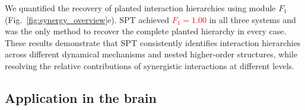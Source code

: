 \documentclass[fleqn,10pt]{wlscirep}
\newcommand{\rev}[1]{\textcolor{red}{#1}}
\theoremstyle{naturetheorem}
\begin{document}
We quantified the recovery of planted interaction hierarchies using module $F_1$ (Fig.~\ref{fig:synergy_overview}e). SPT achieved %
\rev{$F_1=1.00$} in all three systems and was the only method to recover the complete planted hierarchy in every case. These results demonstrate that SPT consistently identifies interaction hierarchies across different dynamical mechanisms and nested higher-order structures, while resolving the relative contributions of synergistic interactions at different levels.



\subsection*{Application in the brain}


\end{document}

